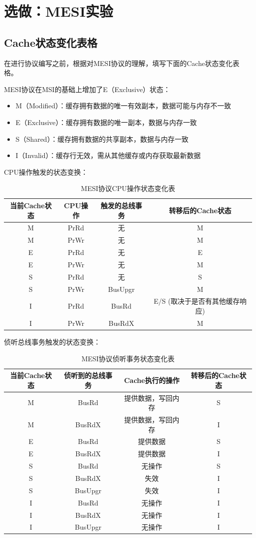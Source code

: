 \documentclass[a4paper]{article}
\begin{document}
\section{选做：MESI实验}

\subsection{Cache状态变化表格}

在进行协议编写之前，根据对MESI协议的理解，填写下面的Cache状态变化表格。

MESI协议在MSI的基础上增加了E（Exclusive）状态：
\begin{itemize}
    \item M（Modified）：缓存拥有数据的唯一有效副本，数据可能与内存不一致
    \item E（Exclusive）：缓存拥有数据的唯一副本，数据与内存一致
    \item S（Shared）：缓存拥有数据的共享副本，数据与内存一致
    \item I（Invalid）：缓存行无效，需从其他缓存或内存获取最新数据
\end{itemize}

CPU操作触发的状态变换：
\begin{table}[H]
\centering
\begin{tabular}{|c|c|c|c|}
\hline
当前Cache状态 & CPU操作 & 触发的总线事务 & 转移后的Cache状态 \\
\hline
M & PrRd & 无 & M \\
M & PrWr & 无 & M \\
E & PrRd & 无 & E \\
E & PrWr & 无 & M \\
S & PrRd & 无 & S \\
S & PrWr & BusUpgr & M \\
I & PrRd & BusRd & E/S (取决于是否有其他缓存响应) \\
I & PrWr & BusRdX & M \\
\hline
\end{tabular}
\caption{MESI协议CPU操作状态变化表}
\end{table}

侦听总线事务触发的状态变换：
\begin{table}[H]
\centering
\begin{tabular}{|c|c|c|c|}
\hline
当前Cache状态 & 侦听到的总线事务 & Cache执行的操作 & 转移后的Cache状态 \\
\hline
M & BusRd & 提供数据，写回内存 & S \\
M & BusRdX & 提供数据，写回内存 & I \\
E & BusRd & 提供数据 & S \\
E & BusRdX & 提供数据 & I \\
S & BusRd & 无操作 & S \\
S & BusRdX & 失效 & I \\
S & BusUpgr & 失效 & I \\
I & BusRd & 无操作 & I \\
I & BusRdX & 无操作 & I \\
I & BusUpgr & 无操作 & I \\
\hline
\end{tabular}
\caption{MESI协议侦听事务状态变化表}
\end{table}
\end{document}
